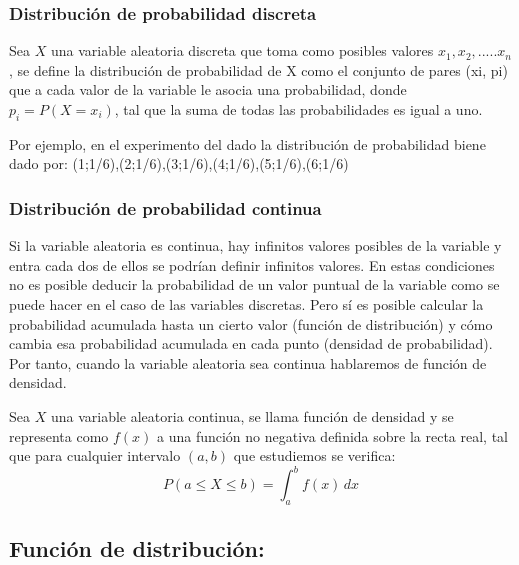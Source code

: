 \documentclass[
  12pt,
]{krantz}
\theoremstyle{definition}
\theoremstyle{definition}
\theoremstyle{definition}
\theoremstyle{remark}
\let\BeginKnitrBlock\begin \let\EndKnitrBlock\end
\begin{document}
\hypertarget{distribucion-de-probabilidad-discreta}{%
\subsubsection{Distribución de probabilidad discreta}\label{distribucion-de-probabilidad-discreta}}

Sea \(X\) una variable aleatoria discreta que toma como posibles valores \(x_1,x_2,.....x_n\), se define la distribución de probabilidad de X como el conjunto de pares (xi, pi) que a cada valor de la variable le asocia una probabilidad, donde \(p_i= P(X=x_i)\), tal que la suma de todas las probabilidades es igual a uno.

Por ejemplo, en el experimento del dado la distribución de probabilidad biene dado por: (1;1/6),(2;1/6),(3;1/6),(4;1/6),(5;1/6),(6;1/6)

\hypertarget{distribucion-de-probabilidad-continua}{%
\subsubsection{Distribución de probabilidad continua}\label{distribucion-de-probabilidad-continua}}

Si la variable aleatoria es continua, hay infinitos valores posibles de la variable y entra cada dos de ellos se podrían definir infinitos valores. En estas condiciones no es posible deducir la probabilidad de un valor puntual de la variable como se puede hacer en el caso de las variables discretas. Pero sí es posible calcular la probabilidad acumulada hasta un cierto valor (función de distribución) y cómo cambia esa probabilidad acumulada en cada punto (densidad de probabilidad). Por tanto, cuando la variable aleatoria sea continua hablaremos de función de densidad.

\BeginKnitrBlock{definition}
\protect\hypertarget{def:defi-func-dens}{}{\label{def:defi-func-dens} }Sea \(X\) una variable aleatoria continua, se llama función de densidad y se representa como \(f(x)\) a una función no negativa definida sobre la recta real, tal que para cualquier intervalo \((a,b)\) que estudiemos se verifica: \[P(a\leq X \leq b) = \int_{a}^{b}  \! f(x) \, dx\]
\EndKnitrBlock{definition}

\hypertarget{funcion-de-distribucion}{%
\subsection{Función de distribución:}\label{funcion-de-distribucion}}
\end{document}
